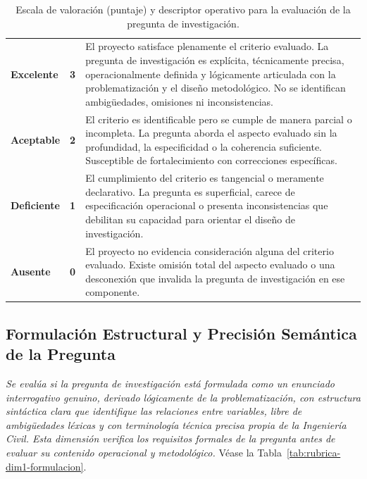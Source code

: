 \begin{table}[htbp]
\centering
\scriptsize
\caption{Escala de valoración (puntaje) y descriptor operativo para la evaluación de la pregunta de investigación.}
\label{tab:escala-pregunta}
\begin{tabularx}{\textwidth}{|C{2.8cm}|C{1cm}|X|}
\hline
{}
 &  &  \\ \hline
\textcolor{csuf}{\textbf{Excelente}} & \textbf{3} & El proyecto satisface plenamente el criterio evaluado. La pregunta de investigación es explícita, técnicamente precisa, operacionalmente definida y lógicamente articulada con la problematización y el diseño metodológico. No se identifican ambigüedades, omisiones ni inconsistencias. \\ \hline
{}
\textcolor{cace}{\textbf{Aceptable}} & \textbf{2} & El criterio es identificable pero se cumple de manera parcial o incompleta. La pregunta aborda el aspecto evaluado sin la profundidad, la especificidad o la coherencia suficiente. Susceptible de fortalecimiento con correcciones específicas. \\ \hline
\textcolor{cdef}{\textbf{Deficiente}} & \textbf{1} & El cumplimiento del criterio es tangencial o meramente declarativo. La pregunta es superficial, carece de especificación operacional o presenta inconsistencias que debilitan su capacidad para orientar el diseño de investigación. \\ \hline
{}
\textcolor{cins}{\textbf{Ausente}} & \textbf{0} & El proyecto no evidencia consideración alguna del criterio evaluado. Existe omisión total del aspecto evaluado o una desconexión que invalida la pregunta de investigación en ese componente. \\ \hline
\end{tabularx}
\end{table}

\clearpage
\subsection{Formulación Estructural y Precisión Semántica de la Pregunta}

\textit{Se evalúa si la pregunta de investigación está formulada como un enunciado interrogativo genuino, derivado lógicamente de la problematización, con estructura sintáctica clara que identifique las relaciones entre variables, libre de ambigüedades léxicas y con terminología técnica precisa propia de la Ingeniería Civil. Esta dimensión verifica los requisitos formales de la pregunta antes de evaluar su contenido operacional y metodológico.} Véase la Tabla~\ref{tab:rubrica-dim1-formulacion}.

